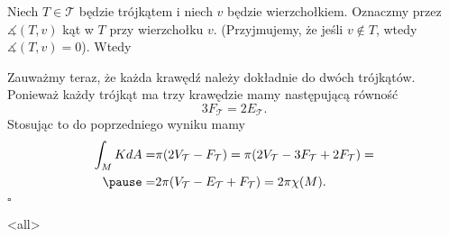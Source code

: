 \begin{frame}

Niech $T\in \mathcal{T}$ będzie trójkątem i niech $v$ będzie wierzchołkiem. Oznaczmy przez $\measuredangle(T,v)$ kąt w $T$ przy wierzchołku $v$. (Przyjmujemy, że jeśli $v\notin T$, wtedy $\measuredangle(T,v)=0$). \pause Wtedy 
\end{frame}
\begin{frame}
\pause Zauważmy teraz, że każda krawędź należy dokładnie do dwóch trójkątów. Ponieważ każdy trójkąt ma trzy krawędzie mamy następującą równość
\[3F_\mathcal{T}=2E_\mathcal{T}.\]\pause
Stosując to do poprzedniego wyniku mamy
\begin{align*}
\int_M K dA=&\pi(2V_\mathcal{T}-F_\mathcal{T})=\pi( 2V_\mathcal{T}-3F_\mathcal{T}+2F_\mathcal{T})=\\\pause
=&2\pi( V_\mathcal{T}-E_\mathcal{T}+F_\mathcal{T})=2\pi \chi(M).
\end{align*}
\vspace*{-0.2in}\hfill $\square$
\end{frame}
\mode<all> 
